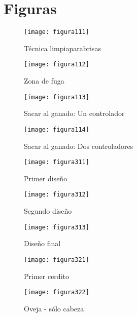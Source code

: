 \section{Figuras}
\label{sec:figuras}


\begin{figure}[h]
\texttt{[image: figura111]}\\
\centering
\caption{Técnica limpiaparabrisas}
\label{fig:figura111}
\end{figure}


\begin{figure}
\texttt{[image: figura112]}\\
\centering
\caption{Zona de fuga}
\label{fig:figura112}
\end{figure}


\begin{figure}
\texttt{[image: figura113]}\\
\centering
\caption{Sacar al ganado: Un controlador}
\label{fig:figura113}
\end{figure}


\begin{figure}
\texttt{[image: figura114]}\\
\centering
\caption{Sacar al ganado: Dos controladores}
\label{fig:figura114}
\end{figure}


\begin{figure}
\texttt{[image: figura311]}\\
\centering
\caption{Primer diseño}
\label{fig:figura311}
\end{figure}


\begin{figure}
\texttt{[image: figura312]}\\
\centering
\caption{Segundo diseño}
\label{fig:figura312}
\end{figure}


\begin{figure}
\texttt{[image: figura313]}\\
\centering
\caption{Diseño final}
\label{fig:figura313}
\end{figure}


\begin{figure}
\texttt{[image: figura321]}\\
\centering
\caption{Primer cerdito}
\label{fig:figura321}
\end{figure}


\begin{figure}
\texttt{[image: figura322]}\\
\centering
\caption{Oveja - sólo cabeza}
\label{fig:figura322}
\end{figure}


